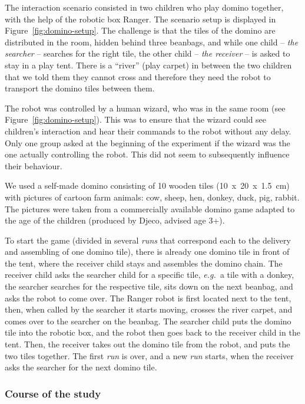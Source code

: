 \documentclass{sig-alternate}
\newcommand{\eg}{{\textit{e.g.~}}}
\begin{document}
The interaction scenario consisted in two children who play domino together,
with the help of the robotic box Ranger. The scenario setup is displayed in
Figure~\ref{fig:domino-setup}. The challenge is that the tiles of the domino are
distributed in the room, hidden behind three beanbags, and while one child --
\textit{the searcher} -- searches for the right tile, the other child --
\textit{the receiver} -- is asked to stay in a play tent. There is a ``river''
(play carpet) in between the two children that we told them they cannot cross
and therefore they need the robot to transport the domino tiles between them.

The robot was controlled by a human wizard, who was in the same room (see
Figure~\ref{fig:domino-setup}). This was to ensure that the wizard could see
children's interaction and hear their commands to the robot without any delay.
Only one group asked at the beginning of the experiment if the wizard was the
one actually controlling the robot. This did not seem to subsequently influence
their behaviour.


We used a self-made domino consisting of 10 wooden tiles (10~x~20~x~1.5~cm) with
pictures of cartoon farm animals: cow, sheep, hen, donkey, duck, pig, rabbit.
The pictures were taken from a commercially available domino game adapted to the
age of the children (produced by Djeco, advised age 3+). 

To start the game (divided in several \emph{runs} that correspond each to the
delivery and assembling of one domino tile), there is already one domino tile in
front of the tent, where the receiver child stays and assembles the domino
chain. The receiver child asks the searcher child for a specific tile, \eg a
tile with a donkey, the searcher searches for the respective tile, sits down on
the next beanbag, and asks the robot to come over.  The Ranger robot is first
located next to the tent, then, when called by the searcher it starts moving,
crosses the river carpet, and comes over to the searcher on the beanbag. The
searcher child puts the domino tile into the robotic box, and the robot then
goes back to the receiver child in the tent. Then, the receiver takes out the
domino tile from the robot, and puts the two tiles together. The first
\emph{run} is over, and a new \emph{run} starts, when the receiver asks the
searcher for the next domino tile.

\subsubsection{Course of the study}
\end{document}
